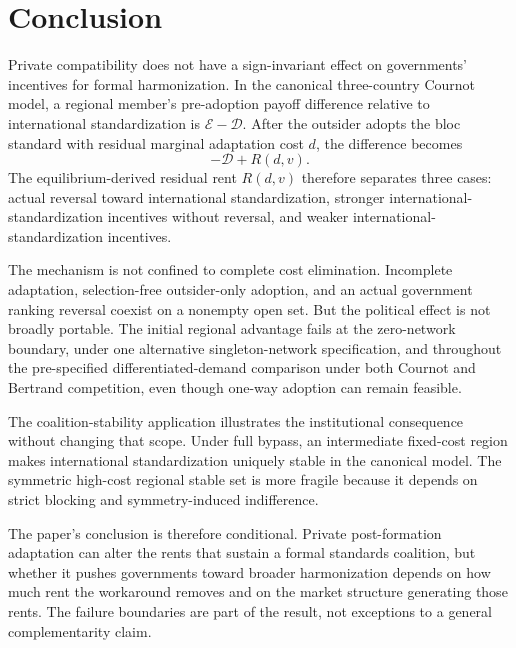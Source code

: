 \section{Conclusion}
\label{sec:conclusion}

Private compatibility does not have a sign-invariant effect on governments' incentives for formal harmonization. In the canonical three-country Cournot model, a regional member's pre-adoption payoff difference relative to international standardization is $\mathscr E-\mathscr D$. After the outsider adopts the bloc standard with residual marginal adaptation cost $d$, the difference becomes
\[
-\mathscr D+R(d,v).
\]
The equilibrium-derived residual rent $R(d,v)$ therefore separates three cases: actual reversal toward international standardization, stronger international-standardization incentives without reversal, and weaker international-standardization incentives.

The mechanism is not confined to complete cost elimination. Incomplete adaptation, selection-free outsider-only adoption, and an actual government ranking reversal coexist on a nonempty open set. But the political effect is not broadly portable. The initial regional advantage fails at the zero-network boundary, under one alternative singleton-network specification, and throughout the pre-specified differentiated-demand comparison under both Cournot and Bertrand competition, even though one-way adoption can remain feasible.

The coalition-stability application illustrates the institutional consequence without changing that scope. Under full bypass, an intermediate fixed-cost region makes international standardization uniquely stable in the canonical model. The symmetric high-cost regional stable set is more fragile because it depends on strict blocking and symmetry-induced indifference.

The paper's conclusion is therefore conditional. Private post-formation adaptation can alter the rents that sustain a formal standards coalition, but whether it pushes governments toward broader harmonization depends on how much rent the workaround removes and on the market structure generating those rents. The failure boundaries are part of the result, not exceptions to a general complementarity claim.
